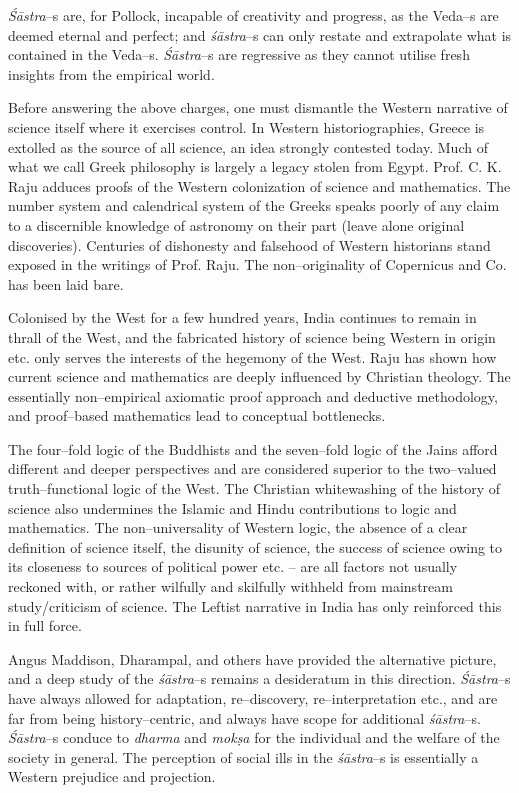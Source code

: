 \textit{Śāstra}–s are, for Pollock, incapable of creativity and progress, as the Veda–s are deemed eternal and perfect; and \textit{śāstra}–s can only restate and extrapolate what is contained in the Veda–s. \textit{Śāstra}–s are regressive as they cannot utilise fresh insights from the empirical world.

Before answering the above charges, one must dismantle the Western narrative of science itself where it exercises control. In Western historiographies, Greece is extolled as the source of all science, an idea strongly contested today. Much of what we call Greek philosophy is largely a legacy stolen from Egypt. Prof. C. K. Raju adduces proofs of the Western colonization of science and mathematics. The number system and calendrical system of the Greeks speaks poorly of any claim to a discernible knowledge of astronomy on their part (leave alone original discoveries). Centuries of dishonesty and falsehood of Western historians stand exposed in the writings of Prof. Raju. The non–originality of Copernicus and Co. has been laid bare. 

Colonised by the West for a few hundred years, India continues to remain in thrall of the West, and the fabricated history of science being Western in origin etc. only serves the interests of the hegemony of the West. Raju has shown how current science and mathematics are deeply influenced by Christian theology. The essentially non–empirical axiomatic proof approach and deductive methodology, and proof–based mathematics lead to conceptual bottlenecks.

The four–fold logic of the Buddhists and the seven–fold logic of the Jains afford different and deeper perspectives and are considered superior to the two–valued truth–functional logic of the West. The Christian whitewashing of the history of science also undermines the Islamic and Hindu contributions to logic and mathematics. The non–universality of Western logic, the absence of a clear definition of science itself, the disunity of science, the success of science owing to its closeness to sources of political power etc. – are all factors not usually reckoned with, or rather wilfully and skilfully withheld from mainstream study/criticism of science. The Leftist narrative in India has only reinforced this in full force.

Angus Maddison, Dharampal, and others have provided the alternative picture, and a deep study of the \textit{śāstra}–s remains a desideratum in this direction. \textit{Śāstra}–s have always allowed for adaptation, re–discovery, re–interpretation etc., and are far from being history–centric, and always have scope for additional \textit{śāstra}–s. \textit{Śāstra}–s conduce to \textit{dharma} and \textit{mokṣa} for the individual and the welfare of the society in general. The perception of social ills in the \textit{śāstra}–s is essentially a Western prejudice and projection.


